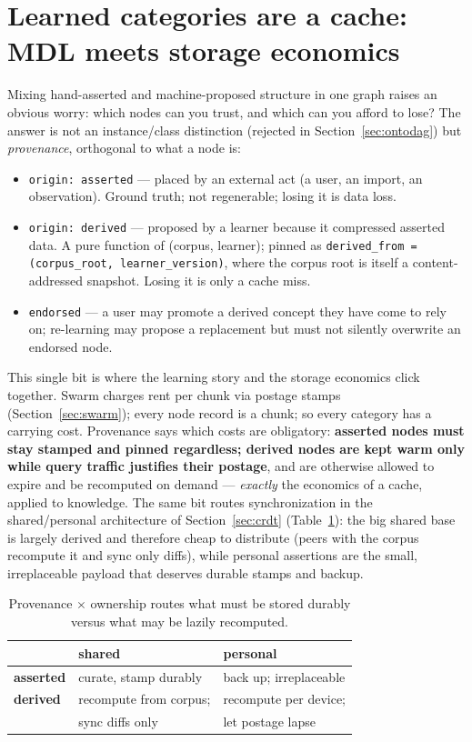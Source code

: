\documentclass[10pt,twocolumn]{article}
\begin{document}
\section{Learned categories are a cache: MDL meets storage economics}
\label{sec:econ}

Mixing hand-asserted and machine-proposed structure in one graph raises an
obvious worry: which nodes can you trust, and which can you afford to
lose? The answer is not an instance/class distinction (rejected in
Section~\ref{sec:ontodag}) but \emph{provenance}, orthogonal to what a
node is:

\begin{itemize}
  \item \texttt{origin: asserted} --- placed by an external act (a user,
  an import, an observation). Ground truth; not regenerable; losing it is
  data loss.
  \item \texttt{origin: derived} --- proposed by a learner because it
  compressed asserted data. A pure function of (corpus, learner); pinned
  as \texttt{derived\_from = (corpus\_root, learner\_version)}, where the
  corpus root is itself a content-addressed snapshot. Losing it is only a
  cache miss.
  \item \texttt{endorsed} --- a user may promote a derived concept they
  have come to rely on; re-learning may propose a replacement but must not
  silently overwrite an endorsed node.
\end{itemize}

This single bit is where the learning story and the storage economics
click together. Swarm charges rent per chunk via postage stamps
(Section~\ref{sec:swarm}); every node record is a chunk; so every category
has a carrying cost. Provenance says which costs are obligatory:
\textbf{asserted nodes must stay stamped and pinned regardless; derived
nodes are kept warm only while query traffic justifies their postage},
and are otherwise allowed to expire and be recomputed on demand ---
\emph{exactly} the economics of a cache, applied to knowledge. The same
bit routes synchronization in the shared/personal architecture of
Section~\ref{sec:crdt} (Table~\ref{tab:2x2}): the big shared base is
largely derived and therefore cheap to distribute (peers with the corpus
recompute it and sync only diffs), while personal assertions are the
small, irreplaceable payload that deserves durable stamps and backup.

\begin{table}[t]
\centering
\footnotesize
\setlength{\tabcolsep}{4pt}
\begin{tabular}{@{}lll@{}}
\toprule
 & \textbf{shared} & \textbf{personal} \\
\midrule
\textbf{asserted} & curate, stamp durably & back up; irreplaceable \\
\textbf{derived}  & recompute from corpus; & recompute per device; \\
                  & sync diffs only        & let postage lapse \\
\bottomrule
\end{tabular}
\caption{Provenance $\times$ ownership routes what must be stored durably
versus what may be lazily recomputed.}
\label{tab:2x2}
\end{table}
\end{document}
